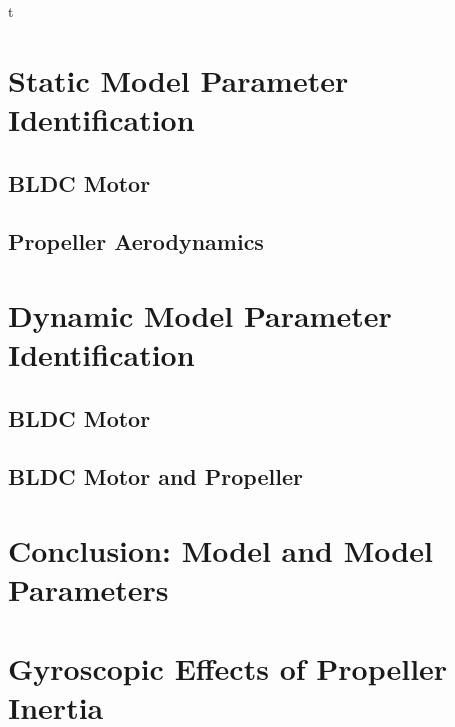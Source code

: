 t \documentclass[letterpaper, 11pt]{article}
\begin{document}
\section{Static Model Parameter Identification}
\subsection{BLDC Motor}
\subsection{Propeller Aerodynamics}
\newpage


\section{Dynamic Model Parameter Identification}
\subsection{BLDC Motor}
\subsection{BLDC Motor and Propeller}
\newpage


\section{Conclusion: Model and Model Parameters}
\newpage


\section{Gyroscopic Effects of Propeller Inertia}
\newpage
\end{document}
